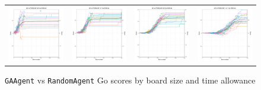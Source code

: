 \begin{figure}
\begin{tabular}{cccc}
\hspace{-0.5cm}\includegraphics[width = 1.55in]{images/Visualizations/GAvsRANDOM/8000ms5x5.png} &
\hspace{-0.5cm}\includegraphics[width = 1.55in]{images/Visualizations/GAvsRANDOM/8000ms7x7.png} &
\hspace{-0.5cm}\includegraphics[width = 1.55in]{images/Visualizations/GAvsRANDOM/8000ms9x9.png} &
\hspace{-0.5cm}\includegraphics[width = 1.55in]{images/Visualizations/GAvsRANDOM/8000ms11x11.png} \\
\end{tabular}
\caption{\texttt{GAAgent} vs \texttt{RandomAgent} Go scores by board size and time allowance}
\label{app:garandscore}
\end{figure}

